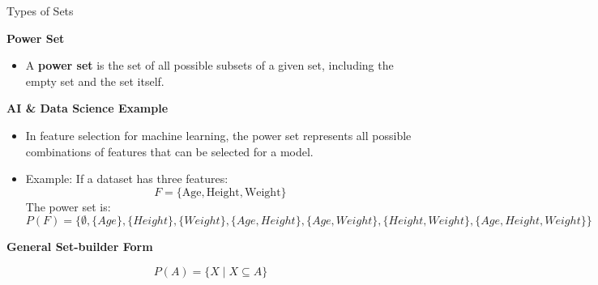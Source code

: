 \documentclass{beamer}
\begin{document}
\begin{frame}{Types of Sets}

\textbf{Power Set}

\begin{itemize}
    \item A \textbf{power set} is the set of all possible subsets of a given set, including the empty set and the set itself.
\end{itemize}

\vspace{0.3cm}

\textbf{AI \& Data Science Example}

\begin{itemize}
    \item In feature selection for machine learning, the power set represents all possible combinations of features that can be selected for a model.
    \item Example: If a dataset has three features:
    \[
    F=\{\text{Age},\text{Height},\text{Weight}\}
    \]
    The power set is:
    \[
    P(F)=\{\emptyset,\{Age\},\{Height\},\{Weight\},
    \{Age,Height\},\{Age,Weight\},\{Height,Weight\},\{Age,Height,Weight\}\}
    \]
\end{itemize}

\vspace{0.3cm}

\textbf{General Set-builder Form}

\[
P(A)=\{X \mid X\subseteq A\}
\]

\end{frame}
\end{document}
